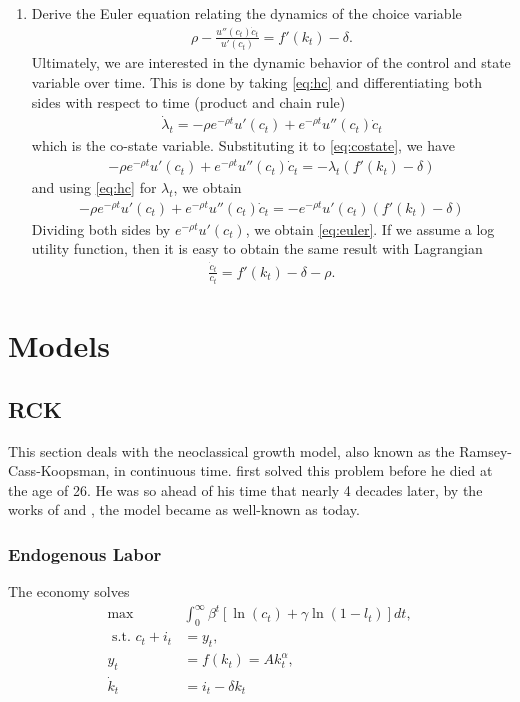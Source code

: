 \documentclass[11pt,a4paper]{book}
\theoremstyle{definition}\newtheorem{definition}{Definition}
\theoremstyle{definition}\newtheorem{fact}{Fact}
\theoremstyle{definition}\newtheorem{remark}{Remark}
\theoremstyle{definition}\newtheorem{ex}{Ex.}
\theoremstyle{definition}\newtheorem{project}{Project}
\theoremstyle{definition}\newtheorem{problem}{Problem}
\theoremstyle{definition}\newtheorem{example}{Example}
\numberwithin{theorem}{section}
\numberwithin{corollary}{chapter}
\numberwithin{assumption}{chapter}
\numberwithin{definition}{chapter}
\numberwithin{prop}{chapter}
\numberwithin{notation}{chapter}
\numberwithin{problem}{chapter}
\numberwithin{example}{chapter}
\numberwithin{fact}{chapter}
\numberwithin{ex}{chapter}
\begin{document}
\begin{enumerate}
		\item Derive the Euler equation relating the dynamics of the choice variable
		\begin{align}
			\rho - \frac{u''(c_t) \dot{c}_t}{u'(c_t)} = f'(k_t) - \delta. \label{eq:euler}
		\end{align}
		Ultimately, we are interested in the dynamic behavior of the control and state variable over time. This is done by taking \eqref{eq:hc} and differentiating both sides with respect to time (product and chain rule)
		\begin{align}
			\dot{\lambda}_t = -\rho e^{-\rho t} u'(c_t) + e^{-\rho t} u''(c_t) \dot{c}_t
		\end{align}
		which is the co-state variable. Substituting it to \eqref{eq:costate}, we have
		\begin{align*}
			-\rho e^{-\rho t} u'(c_t) + e^{-\rho t} u''(c_t) \dot{c}_t = -\lambda_t (f'(k_t)-\delta)
		\end{align*}
		and using \eqref{eq:hc} for $\lambda_t$, we obtain
		\begin{align*}
			-\rho e^{-\rho t} u'(c_t) + e^{-\rho t} u''(c_t) \dot{c}_t = - e^{-\rho t} u'(c_t) (f'(k_t)-\delta)
		\end{align*}
		Dividing both sides by $e^{-\rho t} u'(c_t)$, we obtain \eqref{eq:euler}. If we assume a log utility function, then it is easy to obtain the same result with Lagrangian
		\begin{align*}
			\frac{\dot{c}_t}{c_t} = f'(k_t) - \delta - \rho. 
		\end{align*}
	\end{enumerate}
	
	\section{Models}
	
	\subsection{RCK}
	This section deals with the neoclassical growth model, also known as the Ramsey-Cass-Koopsman, in continuous time. \citet{ramsey1928mathematical} first solved this problem before he died at the age of 26. He was so ahead of his time that nearly 4 decades later, by the works of \citet{cass1965optimum} and \citet{koopmans1963concept}, the model became as well-known as today. 
	
	\subsubsection{Endogenous Labor}
	The economy solves
	\begin{align*}
		\max & \int^\infty_0  \beta^t \left[ \ln(c_t) + \gamma \ln(1-l_t)\right] dt, \\
		\text{ s.t. } c_t + i_t &= y_t, \\
		y_t &= f(k_t) = A k_t^\alpha, \\
		\dot{k}_t &= i_t - \delta k_t
	\end{align*}
	
\end{document}

